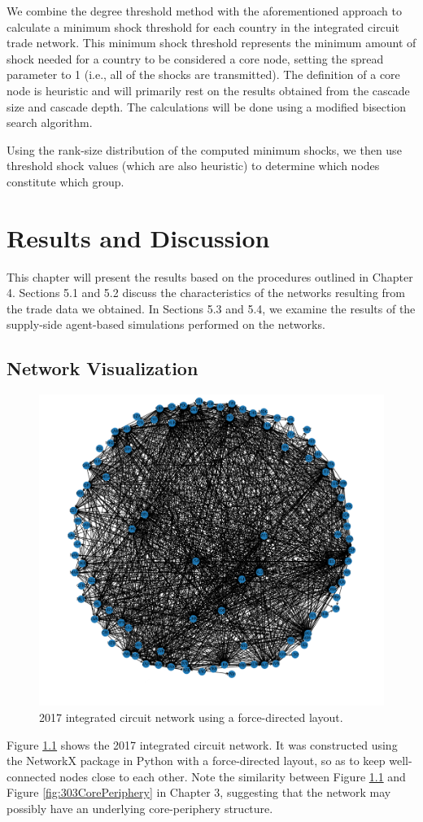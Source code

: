 \documentclass[12pt,letterpaper]{report}
\begin{document}
	We combine the degree threshold method with the aforementioned approach to calculate a minimum shock threshold for each country in the integrated circuit trade network. This minimum shock threshold represents the minimum amount of shock needed for a country to be considered a core node, setting the spread parameter to 1 (i.e., all of the shocks are transmitted). The definition of a core node is heuristic and will primarily rest on the results obtained from the cascade size and cascade depth. The calculations will be done using a modified bisection search algorithm.
	
	Using the rank-size distribution of the computed minimum shocks, we then 
	use threshold shock values (which are also heuristic) to determine which nodes constitute which group.
	
\chapter{Results and Discussion}
\label{chap:5Results}
This chapter will present the results based on the procedures outlined in Chapter 4. Sections 5.1 and 5.2 discuss the characteristics of the networks resulting from the trade data we obtained. In Sections 5.3 and 5.4, we examine the results of the supply-side agent-based simulations performed on the networks.

	\section{Network Visualization}
	\label{sec:51networkVisualization}
	
	\begin{figure}[!h]
		\centering
		\includegraphics[width=0.5\columnwidth]{Fig501-ICNetwork.png}
		\caption{2017 integrated circuit network using a force-directed layout.}\label{fig:501ICNetwork}
	\end{figure}
	
	Figure \ref{fig:501ICNetwork} shows the 2017 integrated circuit network. It was constructed using the NetworkX package in Python with a force-directed layout, so as to keep well-connected nodes close to each other. Note the similarity between Figure \ref{fig:501ICNetwork} and Figure \ref{fig:303CorePeriphery} in Chapter 3, suggesting that the network may possibly have an underlying core-periphery structure.
	
\end{document}
